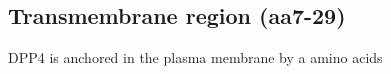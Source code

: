 \subsection{Transmembrane region (aa7-29)}

DPP4 is anchored in the plasma membrane by a  amino acids 